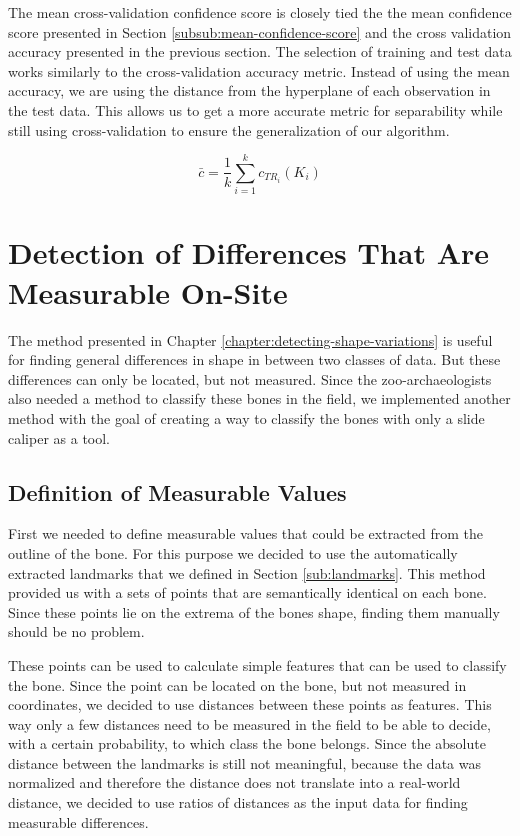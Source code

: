 \documentclass[pdftex,12pt,a4paper]{report}
\begin{document}
The mean cross-validation confidence score is closely tied the the mean confidence score presented in Section \ref{subsub:mean-confidence-score} and the cross validation accuracy presented in the previous section. The selection of training and test data works similarly to the cross-validation accuracy metric. Instead of using the mean accuracy, we are using the distance from the hyperplane of each observation in the test data. This allows us to get a more accurate metric for separability while still using cross-validation to ensure the generalization of our algorithm.

\begin{equation}
\bar{c} = \frac{1}{k} \sum_{i=1}^k c_{TR_i}(K_i)
\end{equation}

\chapter{Detection of Differences That Are Measurable On-Site}
\label{chapter:measurable-differences}

The method presented in Chapter \ref{chapter:detecting-shape-variations} is useful for finding general differences in shape in between two classes of data. But these differences can only be located, but not measured. Since the zoo-archaeologists also needed a method to classify these bones in the field, we implemented another method with the goal of creating a way to classify the bones with only a slide caliper as a tool.

\section{Definition of Measurable Values}

First we needed to define measurable values that could be extracted from the outline of the bone. For this purpose we decided to use the automatically extracted landmarks that we defined in Section \ref{sub:landmarks}. This method provided us with a sets of points that are semantically identical on each bone. Since these points lie on the extrema of the bones shape, finding them manually should be no problem.

These points can be used to calculate simple features that can be used to classify the bone. Since the point can be located on the bone, but not measured in coordinates, we decided to use distances between these points as features. This way only a few distances need to be measured in the field to be able to decide, with a certain probability, to which class the bone belongs. Since the absolute distance between the landmarks is still not meaningful, because the data was normalized and therefore the distance does not translate into a real-world distance, we decided to use ratios of distances as the input data for finding measurable differences.
\end{document}
